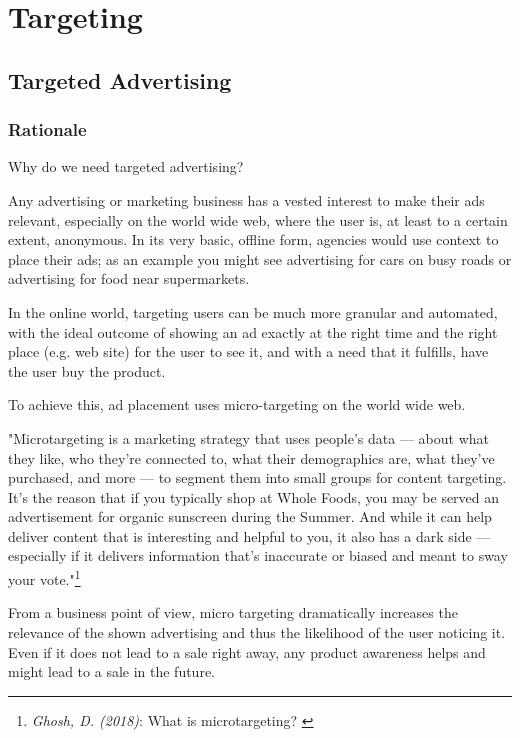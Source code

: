 %
%

\pagebreak
\section{Targeting}

\onehalfspacing

\subsection{Targeted Advertising}

\subsubsection{Rationale}

Why do we need targeted advertising?

Any advertising or marketing business has a vested interest to make their ads relevant, especially on the world wide web, where the user is, at least to a certain extent, anonymous. In its very basic, offline form, agencies would use context to place their ads; as an example you might see advertising for cars on busy roads or advertising for food near supermarkets.

In the online world, targeting users can be much more granular and automated, with the ideal outcome of showing an ad exactly at the right time and the right place (e.g. web site) for the user to see it, and with a need that it fulfills, have the user buy the product.

To achieve this, ad placement uses micro-targeting on the world wide web.

"Microtargeting is a marketing strategy that uses people’s data — about what they like, who they’re connected to, what their demographics are, what they’ve purchased, and more — to segment them into small groups for content targeting. It’s the reason that if you typically shop at Whole Foods, you may be served an advertisement for organic sunscreen during the Summer. And while it can help deliver content that is interesting and helpful to you, it also has a dark side — especially if it delivers information that’s inaccurate or biased and meant to sway your vote."\footnote{\textit{Ghosh, D. (2018)}: What is microtargeting? \cite{mozillaBlog}}

From a business point of view, micro targeting dramatically increases the relevance of the shown advertising and thus the likelihood of the user noticing it. Even if it does not lead to a sale right away, any product awareness helps and might lead to a sale in the future. 

